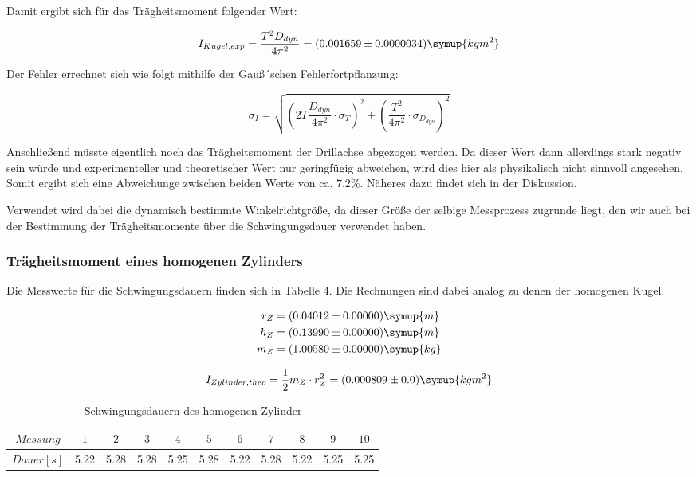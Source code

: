 Damit ergibt sich für das Trägheitsmoment folgender Wert:

\begin{equation}
  I_{Kugel,exp} = \frac{T^2 D_{dyn}}{4\pi^2} = (0.001659 \pm 0.0000034) \symup{kg m^2}
\end{equation}

Der Fehler errechnet sich wie folgt mithilfe der Gauß´schen Fehlerfortpflanzung:

\begin{equation}
  \sigma_I = \sqrt{(2T \frac{D_{dyn}}{4\pi^2} \cdot \sigma_T)^2 + (\frac{T^2}{4\pi^2} \cdot \sigma_{D_{dyn}})^2}
    \label{eqn:sigma}
\end{equation}

Anschließend müsste eigentlich noch das Trägheitsmoment der Drillachse abgezogen werden. Da dieser
Wert dann allerdings stark negativ sein würde und experimenteller und theoretischer Wert nur geringfügig abweichen,
wird dies hier als physikalisch nicht sinnvoll angesehen. Somit ergibt sich eine Abweichunge zwischen
beiden Werte von ca. $7.2 \%$. Näheres dazu findet sich in der Diskussion.

Verwendet wird dabei die dynamisch bestimmte Winkelrichtgröße, da dieser Größe der selbige
Messprozess zugrunde liegt, den wir auch bei der Bestimmung der Trägheitsmomente über die
Schwingungsdauer verwendet haben.

\subsubsection{Trägheitsmoment eines homogenen Zylinders}

Die Messwerte für die Schwingungsdauern finden sich in Tabelle 4. Die Rechnungen sind dabei analog
zu denen der homogenen Kugel.

\begin{align}
  r_Z &= (0.04012 \pm 0.00000) \symup{m} \\
  h_Z &= (0.13990 \pm 0.00000) \symup{m} \\
  m_Z &= (1.00580 \pm 0.00000) \symup{kg}
\end{align}

\begin{equation}
  I_{Zylinder,theo} = \frac{1}{2} m_Z \cdot r_Z^2 = (0.000809 \pm 0.0) \symup{kg m^2}
\end{equation}

\begin{table}
  \centering
  \caption{Schwingungsdauern des homogenen Zylinder}
  \begin{tabular}{c c c c c c c c c c c}
    \toprule $Messung$ & $1$ & $2$ & $3$ & $4$ & $5$ & $6$ & $7$ & $8$ & $9$ & $10$ \\
    \midrule $Dauer [s]$ & 5.22 & 5.28 & 5.28 & 5.25 & 5.28 & 5.22 & 5.28 & 5.22 & 5.25 & 5.25\\
    \bottomrule
  \end{tabular}
\end{table}

